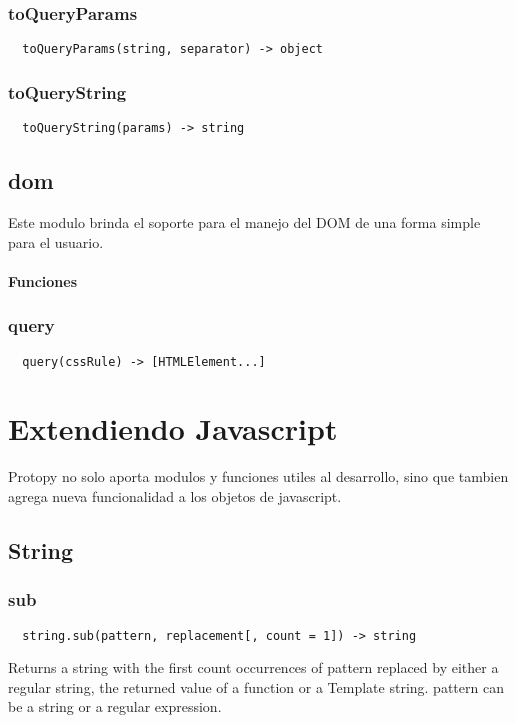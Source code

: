 \subsubsection*{toQueryParams}
\begin{verbatim}
  toQueryParams(string, separator) -> object
\end{verbatim}
\subsubsection*{toQueryString}
\begin{verbatim}
  toQueryString(params) -> string
\end{verbatim}


\subsection{dom}
Este modulo brinda el soporte para el manejo del DOM de una forma simple para el usuario.
\paragraph{Funciones}
\subsubsection*{query}
\begin{verbatim}
  query(cssRule) -> [HTMLElement...]
\end{verbatim}

\section{Extendiendo Javascript}
Protopy no solo aporta modulos y funciones utiles al desarrollo, sino que
tambien agrega nueva funcionalidad a los objetos de javascript.

\subsection{String}
\subsubsection*{sub}
\begin{verbatim}
  string.sub(pattern, replacement[, count = 1]) -> string
\end{verbatim}
Returns a string with the first count occurrences of pattern replaced by either a regular string, the returned value of a function or a Template string. pattern can be a string or a regular expression.

